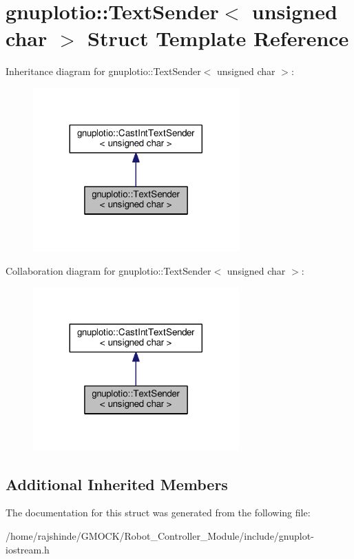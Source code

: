 \hypertarget{structgnuplotio_1_1_text_sender_3_01unsigned_01char_01_4}{}\section{gnuplotio\+:\+:Text\+Sender$<$ unsigned char $>$ Struct Template Reference}
\label{structgnuplotio_1_1_text_sender_3_01unsigned_01char_01_4}


Inheritance diagram for gnuplotio\+:\+:Text\+Sender$<$ unsigned char $>$\+:
\nopagebreak
\begin{figure}[H]
\begin{center}
\leavevmode
\includegraphics[width=224pt]{structgnuplotio_1_1_text_sender_3_01unsigned_01char_01_4__inherit__graph}
\end{center}
\end{figure}


Collaboration diagram for gnuplotio\+:\+:Text\+Sender$<$ unsigned char $>$\+:
\nopagebreak
\begin{figure}[H]
\begin{center}
\leavevmode
\includegraphics[width=224pt]{structgnuplotio_1_1_text_sender_3_01unsigned_01char_01_4__coll__graph}
\end{center}
\end{figure}
\subsection*{Additional Inherited Members}


The documentation for this struct was generated from the following file\+:\begin{DoxyCompactItemize}
\item 
/home/rajshinde/\+G\+M\+O\+C\+K/\+Robot\+\_\+\+Controller\+\_\+\+Module/include/gnuplot-\/iostream.\+h\end{DoxyCompactItemize}
